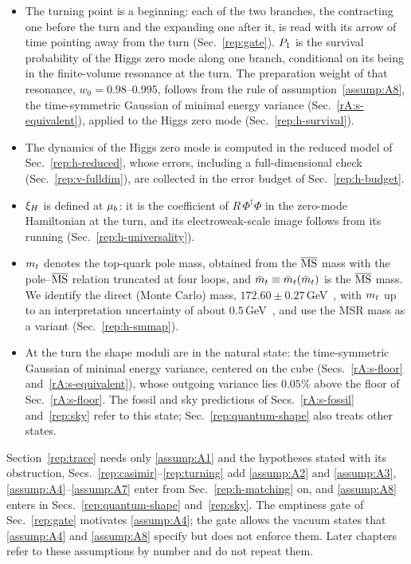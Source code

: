 \begin{itemize}
The inflaton enters the Higgs results only through $\mub$ and the duration of the turn: we assume no direct inflaton--Higgs coupling (portal or mixed non-minimal terms).
\item[(A4)]
The turning point is a beginning: each of the two branches, the contracting one before the turn and the expanding one after it, is read with its arrow of time pointing away from the turn (Sec.~\ref{rep:gate}).
$P_1$ is the survival probability of the Higgs zero mode along one branch, conditional on its being in the finite-volume resonance at the turn.
The preparation weight of that resonance, $w_0=0.98$--$0.995$, follows from the rule of assumption~\ref{assump:A8}, the time-symmetric Gaussian of minimal energy variance (Sec.~\ref{rA:s-equivalent}), applied to the Higgs zero mode (Sec.~\ref{rep:h-survival}). %
\item[(A5)]
The dynamics of the Higgs zero mode is computed in the reduced model of Sec.~\ref{rep:h-reduced}, whose errors, including a full-dimensional check (Sec.~\ref{rep:v-fulldim}), are collected in the error budget of Sec.~\ref{rep:h-budget}.
\item[(A6)]
$\xi_H$ is defined at $\mub$: it is the coefficient of $R\,\Phi^\dagger\Phi$ in the zero-mode Hamiltonian at the turn, and its electroweak-scale image follows from its running (Sec.~\ref{rep:h-universality}).
\item[(A7)]
$m_t$ denotes the top-quark pole mass, obtained from the $\overline{\mathrm{MS}}$ mass with the pole--$\overline{\mathrm{MS}}$ relation truncated at four loops, and $\bar m_t\equiv\bar m_t(\bar m_t)$ is the $\overline{\mathrm{MS}}$ mass.
We identify the direct (Monte Carlo) mass, $172.60\pm0.27$\,GeV~\cite{ParticleDataGroup:2026mpi}, with $m_t$ up to an interpretation uncertainty of about $0.5$\,GeV~\cite{Hoang:2020iah}, and use the MSR mass as a variant (Sec.~\ref{rep:h-smmap}). %
\item[(A8)]
At the turn the shape moduli are in the natural state: the time-symmetric Gaussian of minimal energy variance, centered on the cube (Secs.~\ref{rA:s-floor} and~\ref{rA:s-equivalent}), whose outgoing variance lies $0.05\%$ above the floor of Sec.~\ref{rA:s-floor}. %
The fossil and sky predictions of Secs.~\ref{rA:s-fossil} and~\ref{rep:sky} refer to this state; Sec.~\ref{rep:quantum-shape} also treats other states.
\end{itemize}
Section~\ref{rep:trace} needs only \ref{assump:A1} and the hypotheses stated with its obstruction, Secs.~\ref{rep:casimir}--\ref{rep:turning} add \ref{assump:A2} and \ref{assump:A3}, \ref{assump:A4}--\ref{assump:A7} enter from Sec.~\ref{rep:h-matching} on, and \ref{assump:A8} enters in Secs.~\ref{rep:quantum-shape} and~\ref{rep:sky}.
The emptiness gate of Sec.~\ref{rep:gate} motivates \ref{assump:A4}; the gate allows the vacuum states that \ref{assump:A4} and \ref{assump:A8} specify but does not enforce them.
Later chapters refer to these assumptions by number and do not repeat them.

